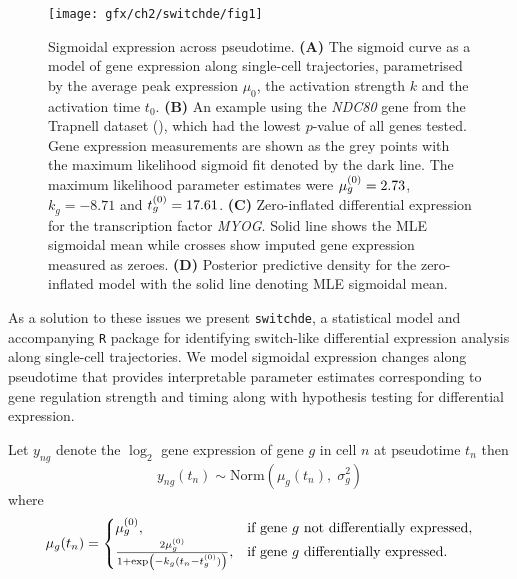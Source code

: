 \begin{figure}[!h]
\centering
\texttt{[image: gfx/ch2/switchde/fig1]}
\caption{Sigmoidal expression across pseudotime.
\textbf{(A)} The sigmoid curve as a model of gene expression along single-cell trajectories, parametrised by the average peak expression $\mu_0$, the activation strength $k$ and the activation time $t_0$.
\textbf{(B)} An example using the \emph{NDC80} gene from the Trapnell dataset (\cite{trapnell2014dynamics}), which had the lowest $p$-value of all genes tested. Gene expression measurements are shown as the grey points with the maximum likelihood sigmoid fit denoted by the dark line. The maximum likelihood parameter estimates were ${\mu^{(0)}_g} = 2.73$, $k_g = -8.71$ and ${t^{(0)}_g} = 17.61$.
\textbf{(C)} Zero-inflated differential expression for the transcription factor \emph{MYOG}. Solid line shows the MLE sigmoidal mean while  crosses show imputed gene expression measured as zeroes.
\textbf{(D)} Posterior predictive density for the zero-inflated model with the solid line denoting MLE sigmoidal mean.
}\label{fig:01}
\end{figure}


As a solution to these issues we present \texttt{switchde}, a statistical model and accompanying \texttt{R} package for identifying switch-like differential expression analysis along single-cell trajectories. We model sigmoidal expression changes along pseudotime that provides interpretable parameter estimates corresponding to gene regulation strength and timing along with hypothesis testing for differential expression.



Let $y_{ng}$ denote the $\log_2$ gene expression of gene $g$ in cell $n$ at pseudotime $t_n$ then
\begin{equation} \label{eq:nzi}
y_{ng}(t_n) \sim \mathrm{Norm}(\mu_g(t_n), \; \sigma_g^2)
\end{equation}
where
\begin{equation}
    \mu_g(t_n) =
\begin{cases}
    \hfil  \mu^{(0)}_g, & \text{if } \text{gene $g$ not differentially expressed},  \\
    \frac{2 \mu^{(0)}_g}{1 + \exp\left(-k_g(t_n - t^{(0)}_g)\right)}, &  \text{if gene $g$ differentially expressed}.
\end{cases}
\end{equation}

